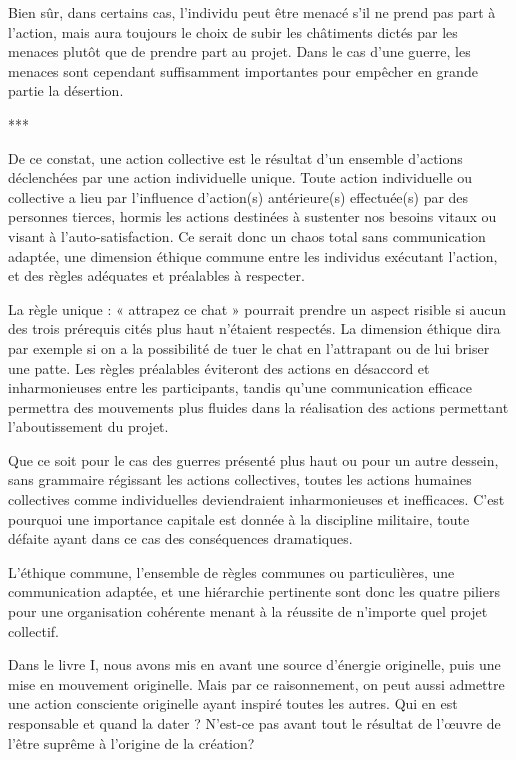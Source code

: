 Bien sûr, dans certains cas, l’individu peut être menacé s’il ne prend pas part à l’action, mais aura toujours le choix de subir les châtiments dictés par les menaces plutôt que de prendre part au projet. Dans le cas d’une guerre, les menaces sont cependant suffisamment importantes pour empêcher en grande partie la désertion.

\begin{center}
***
\end{center}

De ce constat, une action collective est le résultat d’un ensemble d’actions déclenchées par une action individuelle unique. Toute action individuelle ou collective a lieu par l'influence d'action(s) antérieure(s) effectuée(s) par des personnes tierces, hormis les actions destinées à sustenter nos besoins vitaux ou visant à l'auto-satisfaction. Ce serait donc un chaos total sans communication adaptée, une dimension éthique commune entre les individus exécutant l’action, et des règles adéquates et préalables à respecter.

La règle unique : « attrapez ce chat » pourrait prendre un aspect risible si aucun des trois prérequis cités plus haut n’étaient respectés. La dimension éthique dira par exemple si on a la possibilité de tuer le chat en l’attrapant ou de lui briser une patte. Les règles préalables éviteront des actions en désaccord et inharmonieuses entre les participants, tandis qu’une communication efficace permettra des mouvements plus fluides dans la réalisation des actions permettant l'aboutissement du projet.

Que ce soit pour le cas des guerres présenté plus haut ou pour un autre dessein, sans grammaire régissant les actions collectives, toutes les actions humaines collectives comme individuelles deviendraient inharmonieuses et inefficaces. C'est pourquoi une importance capitale est donnée à la discipline militaire, toute défaite ayant dans ce cas des conséquences dramatiques.

L'éthique commune, l'ensemble de règles communes ou particulières, une communication adaptée, et une hiérarchie pertinente sont donc les quatre piliers pour une organisation cohérente menant à la réussite de n'importe quel projet collectif.

Dans le livre I, nous avons mis en avant une source d'énergie originelle, puis une mise en mouvement originelle. Mais par ce raisonnement, on peut aussi admettre une action consciente originelle ayant inspiré toutes les autres. Qui en est responsable et quand la dater ? N'est-ce pas avant tout le résultat de l’œuvre de l'être suprême à l'origine de la création?

